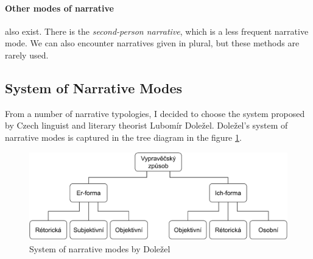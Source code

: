 \paragraph{Other modes of narrative} also exist. There is the \emph{second-person narrative}, which is a less frequent narrative mode. We can also encounter narratives given in plural, but these methods are rarely used.

\subsection{System of Narrative Modes}

From a number of narrative typologies, I decided to choose the system proposed by Czech linguist and literary theorist Lubomír Doležel. Doležel's system of narrative modes is captured in the tree diagram in the figure \ref{fig:schema-dolezel}.\cite{dolezel-narativni-zpusoby}

\begin{figure}[ht]
\includegraphics[width=1\textwidth]{data/dolezel-schema.pdf}
\caption{System of narrative modes by Doležel}
\label{fig:schema-dolezel}
\end{figure}



